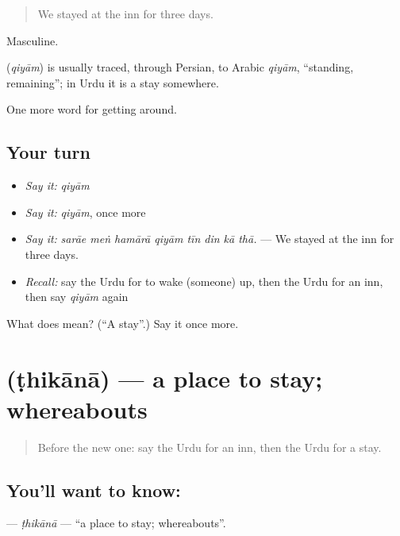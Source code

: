 \begin{quote}
We stayed at the inn for three days.
\end{quote}

Masculine.

\begin{cousinweb}
\textbf{} (\emph{qiyām}) is usually traced, through Persian, to Arabic \emph{qiyām}, \textquotedblleft{}standing, remaining\textquotedblright{}; in Urdu it is a stay somewhere.
\end{cousinweb}

\begin{grammarlens}[title={What you've built}]
One more word for getting around.
\end{grammarlens}

\subsection*{Your turn}
\begin{itemize}
\raggedright
  \item \emph{Say it:} \emph{qiyām}
  \item \emph{Say it:} \emph{qiyām}, once more
  \item \emph{Say it:} \emph{sarāe meṅ hamārā qiyām tīn din kā thā.} — We stayed at the inn for three days.
  \item \emph{Recall:} say the Urdu for to wake (someone) up, then the Urdu for an inn, then say \emph{qiyām} again
\end{itemize}

\begin{tcolorbox}[breakable,colback=teal!4,colframe=teal!35!black,title={Before you move on}]
What does  mean? (\textquotedblleft{}A stay\textquotedblright{}.) Say it once more.
\end{tcolorbox}
\section[\texorpdfstring{\ur{ٹھکانا} (ṭhikānā)}{ٹھکانا (ṭhikānā)}]{ (ṭhikānā) — a place to stay; whereabouts}

\label{lesson:UR-C403-thikana}



\begin{quote}
Before the new one: say the Urdu for an inn, then the Urdu for a stay.
\end{quote}

\subsection*{You'll want to know: }
\textbf{} — \emph{ṭhikānā} — \textquotedblleft{}a place to stay; whereabouts\textquotedblright{}.

